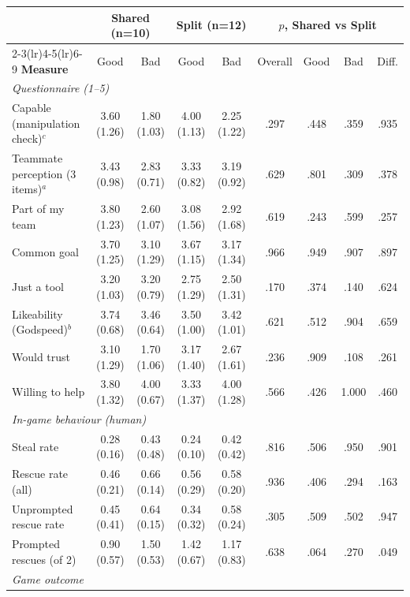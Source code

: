 \begin{table}[H]
\centering
\footnotesize
\setlength{\tabcolsep}{3.5pt}
\begin{tabular}{lcccc|cccc}
\toprule
 & \multicolumn{2}{c}{\textbf{Shared} (n=10)} & \multicolumn{2}{c|}{\textbf{Split} (n=12)} & \multicolumn{4}{c}{\textbf{$p$, Shared vs Split}} \\
\cmidrule(lr){2-3}\cmidrule(lr){4-5}\cmidrule(lr){6-9}
\textbf{Measure} & Good & Bad & Good & Bad & Overall & Good & Bad & Diff. \\
\midrule
\multicolumn{9}{l}{\textit{Questionnaire (1--5)}} \\
Capable (manipulation check)$^{c}$ & 3.60 (1.26) & 1.80 (1.03) & 4.00 (1.13) & 2.25 (1.22) & .297 & .448 & .359 & .935 \\
Teammate perception (3 items)$^{a}$ & 3.43 (0.98) & 2.83 (0.71) & 3.33 (0.82) & 3.19 (0.92) & .629 & .801 & .309 & .378 \\
\quad Part of my team & 3.80 (1.23) & 2.60 (1.07) & 3.08 (1.56) & 2.92 (1.68) & .619 & .243 & .599 & .257 \\
\quad Common goal & 3.70 (1.25) & 3.10 (1.29) & 3.67 (1.15) & 3.17 (1.34) & .966 & .949 & .907 & .897 \\
\quad Just a tool & 3.20 (1.03) & 3.20 (0.79) & 2.75 (1.29) & 2.50 (1.31) & .170 & .374 & .140 & .624 \\
Likeability (Godspeed)$^{b}$ & 3.74 (0.68) & 3.46 (0.64) & 3.50 (1.00) & 3.42 (1.01) & .621 & .512 & .904 & .659 \\
Would trust & 3.10 (1.29) & 1.70 (1.06) & 3.17 (1.40) & 2.67 (1.61) & .236 & .909 & .108 & .261 \\
Willing to help & 3.80 (1.32) & 4.00 (0.67) & 3.33 (1.37) & 4.00 (1.28) & .566 & .426 & 1.000 & .460 \\
\midrule
\multicolumn{9}{l}{\textit{In-game behaviour (human)}} \\
Steal rate & 0.28 (0.16) & 0.43 (0.48) & 0.24 (0.10) & 0.42 (0.42) & .816 & .506 & .950 & .901 \\
Rescue rate (all) & 0.46 (0.21) & 0.66 (0.14) & 0.56 (0.29) & 0.58 (0.20) & .936 & .406 & .294 & .163 \\
Unprompted rescue rate & 0.45 (0.41) & 0.64 (0.15) & 0.34 (0.32) & 0.58 (0.24) & .305 & .509 & .502 & .947 \\
Prompted rescues (of 2) & 0.90 (0.57) & 1.50 (0.53) & 1.42 (0.67) & 1.17 (0.83) & .638 & .064 & .270 & .049 \\
\midrule
\multicolumn{9}{l}{\textit{Game outcome}} \\

\end{tabular}
\end{table}
